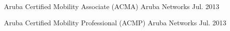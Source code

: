 

\begin{cvhonors}

  \cvhonor
    {Aruba Certified Mobility Associate (ACMA)} %
    {Aruba Networks} %
    {} %
    {Jul. 2013} %

  \cvhonor
    {Aruba Certified Mobility Professional (ACMP)} %
    {Aruba Networks} %
    {} %
    {Jul. 2013} %

\end{cvhonors}
